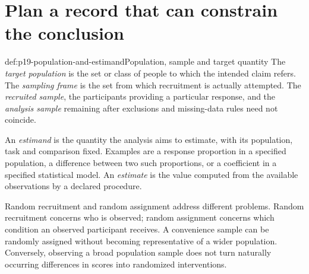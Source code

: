 \section{Plan a record that can constrain the conclusion}
\label{sec:p19-design-and-record}

\begin{hbdefinition}{def:p19-population-and-estimand}{Population, sample and target quantity}
The \emph{target population} is the set or class of people to which the intended
claim refers. The \emph{sampling frame} is the set from which recruitment is
actually attempted. The \emph{recruited sample}, the participants providing a
particular response, and the \emph{analysis sample} remaining after exclusions
and missing-data rules need not coincide.

An \emph{estimand} is the quantity the analysis aims to estimate, with its
population, task and comparison fixed. Examples are a response proportion in
a specified population, a difference between two such proportions, or a
coefficient in a specified statistical model. An \emph{estimate} is the value
computed from the available observations by a declared procedure.
\end{hbdefinition}

Random recruitment and random assignment address different problems. Random
recruitment concerns who is observed; random assignment concerns which
condition an observed participant receives. A convenience sample can be
randomly assigned without becoming representative of a wider population.
Conversely, observing a broad population sample does not turn naturally
occurring differences in scores into randomized interventions.

